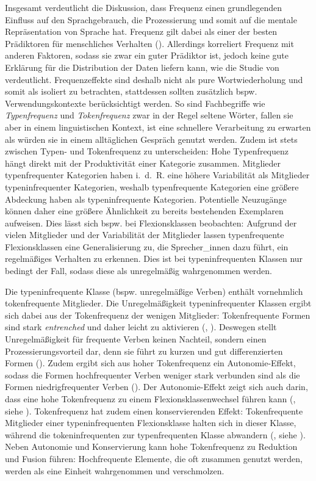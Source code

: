 Insgesamt verdeutlicht die Diskussion, dass Frequenz einen grundlegenden Einfluss auf den Sprachgebrauch, die Prozessierung und somit auf die mentale Repräsentation von Sprache hat. Frequenz gilt dabei als einer der besten Prädiktoren für menschliches Verhalten (\cite[55]{Divjak.2015}). Allerdings korreliert Frequenz mit anderen Faktoren, sodass sie zwar ein guter Prädiktor ist, jedoch keine gute Erklärung für die Distribution der Daten liefern kann, wie die Studie von \textcite{Baayen.2012} verdeutlicht. Frequenzeffekte sind deshalb nicht als pure Wortwiederholung und somit als isoliert zu betrachten, stattdessen sollten zusätzlich bspw. Verwendungskontexte berücksichtigt werden. So sind Fachbegriffe wie \textit{Typenfrequenz} und \textit{Tokenfrequenz} zwar in der Regel seltene Wörter, fallen sie aber in einem linguistischen Kontext, ist eine schnellere Verarbeitung zu erwarten als würden sie in einem alltäglichen Gespräch genutzt werden. Zudem ist stets zwischen Typen- und Tokenfrequenz zu unterscheiden: Hohe Typenfrequenz hängt direkt mit der Produktivität einer Kategorie zusammen. Mitglieder typenfrequenter Kategorien haben i.~d.~R. eine höhere Variabilität als Mitglieder typeninfrequenter Kategorien, weshalb typenfrequente Kategorien eine größere Abdeckung haben als typeninfrequente Kategorien. Potentielle Neuzugänge können daher eine größere Ähnlichkeit zu bereits bestehenden Exemplaren aufweisen. Dies lässt sich bspw. bei Flexionsklassen beobachten: Aufgrund der vielen Mitglieder und der Variabilität der Mitglieder lassen typenfrequente Flexionsklassen eine Generalisierung zu, die Sprecher\_innen dazu führt, ein regelmäßiges Verhalten zu erkennen. Dies ist bei typeninfrequenten Klassen nur bedingt der Fall, sodass diese als unregelmäßig wahrgenommen werden.

Die typeninfrequente Klasse (bspw. unregelmäßige Verben) enthält vornehmlich tokenfrequente Mitglieder. Die Unregelmäßigkeit typeninfrequenter Klassen ergibt sich dabei aus der Tokenfrequenz der wenigen Mitglieder: Tokenfrequente Formen sind stark \textit{entrenched} und daher leicht zu aktivieren (\cite[380]{Bybee.1997}, \cite[13]{Schneider.2014}). Deswegen stellt Unregelmäßigkeit für frequente Verben keinen Nachteil, sondern einen Prozessierungsvorteil dar, denn sie führt zu kurzen und gut differenzierten Formen (\cite[174]{Nowak.2013}). Zudem ergibt sich aus hoher Tokenfrequenz ein Autonomie-Effekt, sodass die Formen hochfrequenter Verben weniger stark verbunden sind als die Formen niedrigfrequenter Verben (\cites[117--124]{Bybee.1985}[715]{Bybee.2006b}). Der Autonomie-Effekt zeigt sich auch darin, dass eine hohe Tokenfrequenz zu einem Flexionsklassenwechsel führen kann (\cite[17--18]{Nubling.2000}, siehe ). Tokenfrequenz hat zudem einen konservierenden Effekt: Tokenfrequente Mitglieder einer typeninfrequenten Flexionsklasse halten sich in dieser Klasse, während die tokeninfrequenten zur typenfrequenten Klasse abwandern (\cite[280]{Bybee.1997}, siehe ). Neben Autonomie und Konservierung kann hohe Tokenfrequenz zu Reduktion und Fusion führen: Hochfrequente Elemente, die oft zusammen genutzt werden, werden als eine Einheit wahrgenommen und verschmolzen.  

